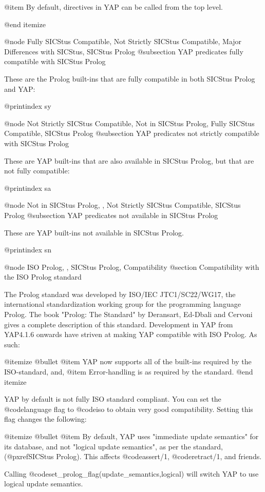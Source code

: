 {{{{{{{{{@item By default, directives in YAP can be called from the top level.

@end itemize

@node Fully SICStus Compatible, Not Strictly SICStus Compatible, Major Differences with SICStus, SICStus Prolog
@subsection YAP predicates fully compatible with SICStus Prolog

These are the Prolog built-ins that are fully compatible in both SICStus
Prolog and YAP:

@printindex sy

@node Not Strictly SICStus Compatible, Not in SICStus Prolog, Fully SICStus Compatible, SICStus Prolog
@subsection YAP predicates not strictly compatible with SICStus Prolog

These are YAP built-ins that are also available in SICStus Prolog, but
that are not fully compatible:

@printindex sa

@node Not in SICStus Prolog, , Not Strictly SICStus Compatible, SICStus Prolog
@subsection YAP predicates not available in SICStus Prolog

These are YAP built-ins not available in SICStus Prolog.

@printindex sn


@node ISO Prolog, , SICStus Prolog, Compatibility
@section Compatibility with the ISO Prolog standard

The Prolog standard was developed by ISO/IEC JTC1/SC22/WG17, the
international standardization working group for the programming language
Prolog. The book "Prolog: The Standard" by Deransart, Ed-Dbali and
Cervoni gives a complete description of this standard. Development in
YAP from YAP4.1.6 onwards have striven at making YAP
compatible with ISO Prolog. As such:

@itemize @bullet
@item   YAP now supports all of the built-ins required by the
ISO-standard, and,
@item   Error-handling is as required by the standard.
@end itemize

YAP by default is not fully ISO standard compliant. You can set the 
@code{language} flag to @code{iso} to obtain very good
compatibility. Setting this flag changes the following:

@itemize @bullet
@item By default, YAP uses "immediate update semantics" for its
database, and not "logical update semantics", as per the standard,
(@pxref{SICStus Prolog}). This affects @code{assert/1},
@code{retract/1}, and friends.

Calling @code{set_prolog_flag(update_semantics,logical)} will switch
YAP to use logical update semantics.

}}}}}}}}}
